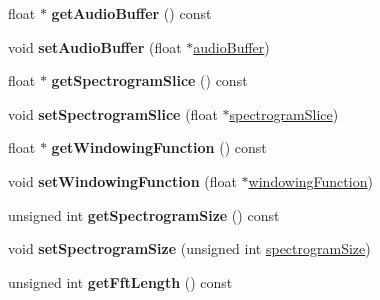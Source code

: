 \begin{DoxyCompactItemize}
\item 
\mbox{\label{classAudioInput_ac56e6ce779b652bd8fc343828a40fe76}} 
float $\ast$ {\bfseries get\+Audio\+Buffer} () const
\item 
\mbox{\label{classAudioInput_a33e4d0a312cc8f3c26f0f06c9bee9fd8}} 
void {\bfseries set\+Audio\+Buffer} (float $\ast$\mbox{\hyperlink{classAudioInput_a797943485896a381ea80947c8b6a8488}{audio\+Buffer}})
\item 
\mbox{\label{classAudioInput_a407e9626c0ab056dd0d4401ce5056d00}} 
float $\ast$ {\bfseries get\+Spectrogram\+Slice} () const
\item 
\mbox{\label{classAudioInput_a55f5b0061a542195af4161c5ef931d2b}} 
void {\bfseries set\+Spectrogram\+Slice} (float $\ast$\mbox{\hyperlink{classAudioInput_aa277accc3be5054fe8439ac7086deaf5}{spectrogram\+Slice}})
\item 
\mbox{\label{classAudioInput_ac7a550e7e3d4312b576978df832d70ec}} 
float $\ast$ {\bfseries get\+Windowing\+Function} () const
\item 
\mbox{\label{classAudioInput_a4c11f1a37408349ee4d7354e1c2fdd11}} 
void {\bfseries set\+Windowing\+Function} (float $\ast$\mbox{\hyperlink{classAudioInput_a72417120c208d81359f5b1205fc06664}{windowing\+Function}})
\item 
\mbox{\label{classAudioInput_afa340ece9b45d8d4bb85972edfe9712b}} 
unsigned int {\bfseries get\+Spectrogram\+Size} () const
\item 
\mbox{\label{classAudioInput_a900f80fe37d48bc77d99cc0971f01ea7}} 
void {\bfseries set\+Spectrogram\+Size} (unsigned int \mbox{\hyperlink{classAudioInput_a1d4982a84d2e2e3d8a6b0f0fcdd4820e}{spectrogram\+Size}})
\item 
\mbox{\label{classAudioInput_a069f76d3553328428959325c1be3ee3e}} 
unsigned int {\bfseries get\+Fft\+Length} () const
\item 
\mbox{\label{classAudioInput_a71e1759bc4267b436bd9b4b8937dcabd}} 

\end{DoxyCompactItemize}
